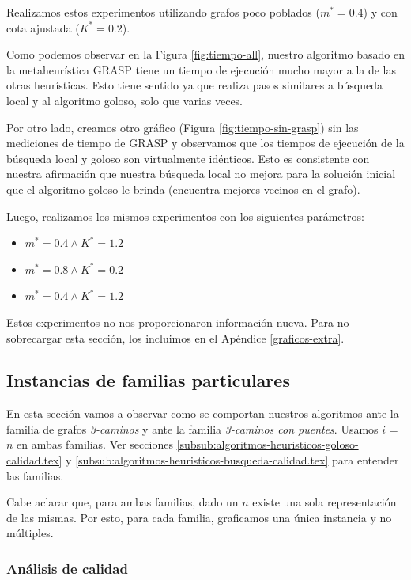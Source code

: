 Realizamos estos experimentos utilizando grafos poco poblados ($m^* = 0.4$) y con cota ajustada ($K^* = 0.2$).

Como podemos observar en la Figura \ref{fig:tiempo-all}, nuestro algoritmo basado en la metaheurística GRASP tiene un tiempo de ejecución mucho mayor a la de las otras heurísticas. Esto tiene sentido ya que realiza pasos similares a búsqueda local y al algoritmo goloso, solo que varias veces.

Por otro lado, creamos otro gráfico (Figura \ref{fig:tiempo-sin-grasp}) sin las mediciones de tiempo de GRASP y observamos que los tiempos de ejecución de la búsqueda local y goloso son virtualmente idénticos. Esto es consistente con nuestra afirmación que nuestra búsqueda local no mejora para la solución inicial que el algoritmo goloso le brinda (encuentra mejores vecinos en el grafo).

Luego, realizamos los mismos experimentos con los siguientes parámetros:

\begin{itemize}
 \item $m^* = 0.4 \wedge K^* = 1.2$
 \item $m^* = 0.8 \wedge K^* = 0.2$
 \item $m^* = 0.4 \wedge K^* = 1.2$
\end{itemize}

Estos experimentos no nos proporcionaron información nueva. Para no sobrecargar esta sección, los incluimos en el Apéndice \ref{graficos-extra}.

\subsection{Instancias de familias particulares}

En esta sección vamos a observar como se comportan nuestros algoritmos ante la familia de grafos \emph{3-caminos} y ante la familia \emph{3-caminos con puentes}. Usamos $i$ = $n$ en ambas familias. Ver secciones \ref{subsub:algoritmos-heuristicos-goloso-calidad.tex} y \ref{subsub:algoritmos-heuristicos-busqueda-calidad.tex} para entender las familias.

Cabe aclarar que, para ambas familias, dado un $n$ existe una sola representación de las mismas. Por esto, para cada familia, graficamos una única instancia y no múltiples.

\subsubsection{Análisis de calidad}

